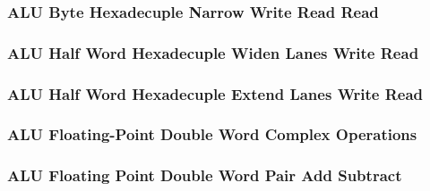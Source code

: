 \subsubsection[{\small ALU Byte Hexadecuple Narrow Write Read Read}]{ALU Byte Hexadecuple Narrow Write Read Read} \label{sec:format-ALU-BXNWRR}



\subsubsection[{\small ALU Half Word Hexadecuple Widen Lanes Write Read}]{ALU Half Word Hexadecuple Widen Lanes Write Read} \label{sec:format-ALU-BXWIDEWR}



\subsubsection[{\small ALU Half Word Hexadecuple Extend Lanes Write Read}]{ALU Half Word Hexadecuple Extend Lanes Write Read} \label{sec:format-ALU-BXEXTLWR}



\subsubsection[{\small ALU Floating-Point Double Word Complex Operations}]{ALU Floating-Point Double Word Complex Operations} \label{sec:format-ALU-FDCOP}



\subsubsection[{\small ALU Floating Point Double Word Pair Add Subtract}]{ALU Floating Point Double Word Pair Add Subtract} \label{sec:format-ALU-FDPADD}



